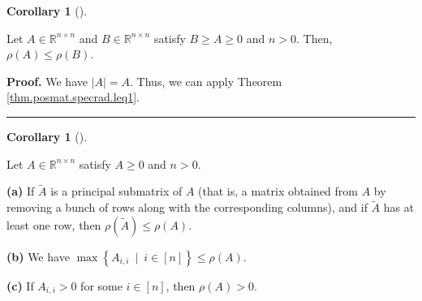 \documentclass[numbers=enddot,12pt,final,onecolumn,notitlepage]{scrartcl}%
\numberwithin{exer}{subsection}
\theoremstyle{definition}
\newtheorem{coro}[theo]{Corollary}
\newenvironment{corollary}[1][]
{\begin{coro}[#1]\begin{leftbar}}
{\end{leftbar}\end{coro}}
\newenvironment{proof}[1][Proof]{\noindent\textbf{#1.} }{\ \rule{0.5em}{0.5em}}
\begin{document}
\begin{corollary}
\label{cor.posmat.specrad.leq1b}Let $A\in\mathbb{R}^{n\times n}$ and
$B\in\mathbb{R}^{n\times n}$ satisfy $B\geq A\geq0$ and $n>0$. Then,
$\rho\left(  A\right)  \leq\rho\left(  B\right)  $.
\end{corollary}

\begin{proof}
We have $\left\vert A\right\vert =A$. Thus, we can apply Theorem
\ref{thm.posmat.specrad.leq1}.
\end{proof}

\begin{corollary}
\label{cor.posmat.specrad.leq1c}Let $A\in\mathbb{R}^{n\times n}$ satisfy
$A\geq0$ and $n>0$. \medskip

\textbf{(a)} If $\widetilde{A}$ is a principal submatrix of $A$ (that is, a
matrix obtained from $A$ by removing a bunch of rows along with the
corresponding columns), and if $\widetilde{A}$ has at least one row, then
$\rho\left(  \widetilde{A}\right)  \leq\rho\left(  A\right)  $. \medskip

\textbf{(b)} We have $\max\left\{  A_{i,i}\ \mid\ i\in\left[  n\right]
\right\}  \leq\rho\left(  A\right)  $. \medskip

\textbf{(c)} If $A_{i,i}>0$ for some $i\in\left[  n\right]  $, then
$\rho\left(  A\right)  >0$.
\end{corollary}
\end{document}
